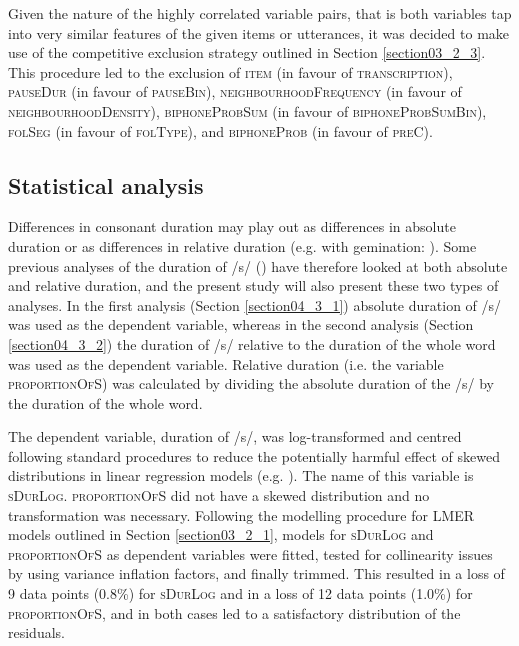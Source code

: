 Given the nature of the highly correlated variable pairs, that is both variables tap into very similar features of the given items or utterances, it was decided to make use of the competitive exclusion strategy outlined in Section \ref{section03_2_3}. This procedure led to the exclusion of \textsc{item} (in favour of \textsc{transcription}), \textsc{pauseDur} (in favour of \textsc{pauseBin}), \textsc{neighbourhoodFrequency} (in favour of \textsc{neighbourhoodDensity}), \textsc{biphoneProbSum} (in favour of \textsc{biphoneProbSumBin}), \textsc{folSeg} (in favour of \textsc{folType}), and \textsc{biphoneProb} (in favour of \textsc{preC}).

\subsection{Statistical analysis}\label{section04_2_4}

Differences in consonant duration may play out as differences in absolute duration or as differences in relative duration (e.g. with gemination: \cite{Oh2012, Ridouane2017, BenHedia2019}). Some previous analyses of the duration of /s/ (\cite{Plag2017}) have therefore looked at both absolute and relative duration, and the present study will also present these two types of analyses. In the first analysis (Section \ref{section04_3_1}) absolute duration of /s/ was used as the dependent variable, whereas in the second analysis (Section \ref{section04_3_2}) the duration of /s/ relative to the duration of the whole word was used as the dependent variable. Relative duration (i.e. the variable \textsc{proportionOfS}) was calculated by dividing the absolute duration of the /s/ by the duration of the whole word. 

The dependent variable, duration of /s/, was log-transformed and centred following standard procedures to reduce the potentially harmful effect of skewed distributions in linear regression models (e.g. \cite{Winter2019}). The name of this variable is \textsc{sDurLog}. \textsc{proportionOfS} did not have a skewed distribution and no transformation was necessary. Following the modelling procedure for LMER models outlined in Section \ref{section03_2_1}, models for \textsc{sDurLog} and \textsc{proportionOfS} as dependent variables were fitted, tested for collinearity issues by using variance inflation factors, and finally trimmed. This resulted in a loss of 9 data points (0.8\%) for \textsc{sDurLog} and in a loss of 12 data points (1.0\%) for \textsc{proportionOfS}, and in both cases led to a satisfactory distribution of the residuals.

